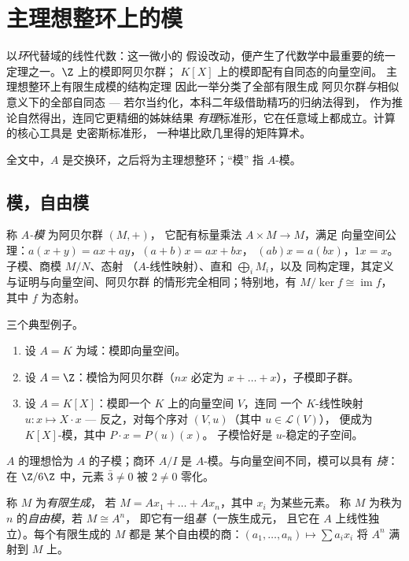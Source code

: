 \chapter{主理想整环上的模}\label{ch:b3:modules}

以\emph{环}代替域的线性代数：这一微小的
假设改动，便产生了代数学中最重要的统一
定理之一。$\Z$ 上的模即阿贝尔群；
$K[X]$ 上的模即配有自同态的向量空间。
主理想整环上有限生成模的结构定理
因此一举分类了全部有限生成
阿贝尔群\emph{与}相似意义下的全部自同态 ---
若尔当约化，本科二年级借助精巧的归纳法得到，
作为推论自然得出，连同它更精细的姊妹结果
\emph{有理}标准形，它在任意域上都成立。计算的核心工具是
史密斯标准形，
一种堪比欧几里得的矩阵算术。

全文中，$A$ 是交换环，之后将为主理想整环；“模”
指 $A$-模。

\section{模，自由模}

\begin{definition}\label{def:b3:modules:module}
称 \emph{$A$-模} 为阿贝尔群 $(M, +)$，
它配有标量乘法 $A \times M \to M$，满足
向量空间公理：$a(x + y) = ax + ay$，$(a + b)x = ax + bx$，
$(ab)x = a(bx)$，$1x = x$。子模、商模 $M/N$、态射
（$A$-线性映射）、直和 $\bigoplus_i M_i$，以及
同构定理，其定义与证明与向量空间、阿贝尔群
的情形完全相同；特别地，有 $M/\ker f \cong
\operatorname{im} f$，其中 $f$ 为态射。
\end{definition}

\begin{example}\label{ex:b3:modules:examples}
三个典型例子。
\begin{enumerate}
  \item 设 $A = K$ 为域：模即向量空间。
  \item 设 $A = \Z$：模恰为阿贝尔群（$nx$ 必定为
        $x + \dots + x$），子模即子群。
  \item 设 $A = K[X]$：模即一个 $K$ 上的向量空间 $V$，连同
        一个 $K$-线性映射 $u\colon x \mapsto X\cdot x$ ---
        反之，对每个序对 $(V, u)$（其中 $u \in \mathcal L(V)$），
        便成为 $K[X]$-模，其中 $P \cdot x = P(u)(x)$。
        子模恰好是 $u$-稳定的子空间。
\end{enumerate}
$A$ 的理想恰为 $A$ 的子模；商环
$A/I$ 是 $A$-模。与向量空间不同，模可以具有
\emph{挠}：在 $\Z/6\Z$ 中，元素 $\bar 3 \ne 0$ 被
$2 \neq 0$ 零化。
\end{example}

\begin{definition}\label{def:b3:modules:free}
称 $M$ 为\emph{有限生成}，
若 $M = Ax_1 + \dots + Ax_n$，其中 $x_i$ 为某些元素。
称 $M$ 为秩为 $n$ 的\emph{自由模}，若 $M \cong A^n$，
即它有一组\emph{基}（一族生成元，
且它在 $A$ 上线性独立）。每个有限生成的 $M$ 都是
某个自由模的商：$(a_1, \dots, a_n) \mapsto \sum a_ix_i$
将 $A^n$ 满射到 $M$ 上。
\end{definition}

